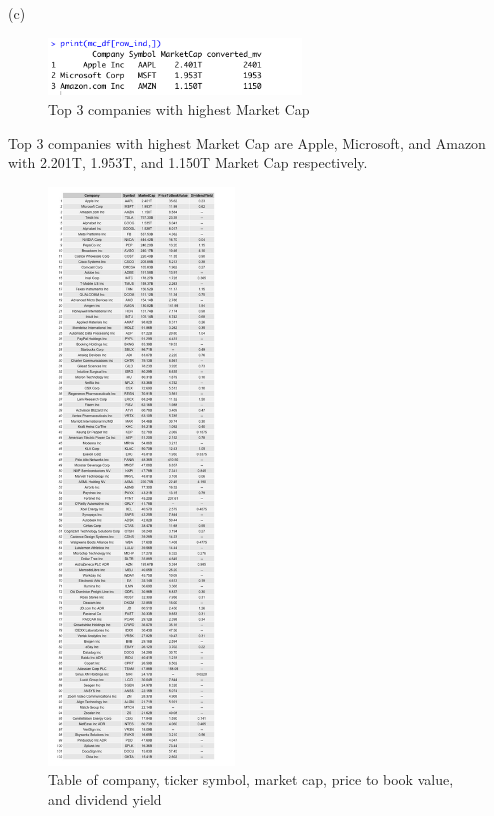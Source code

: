 \documentclass[11pt]{article}
\begin{document}
(c)
\begin{figure}[H]
    \centering
    \includegraphics[width=0.6\textwidth]{figures/Q3c.png}
    \caption{Top 3 companies with highest Market Cap}
\end{figure}
Top 3 companies with highest Market Cap are Apple, Microsoft, and Amazon with 2.201T, 1.953T, and 1.150T Market Cap respectively.
\begin{figure}[H]
    \centering
    \includegraphics[width=0.44\textwidth]{figures/Q3b_data.jpg}
    \caption{Table of company, ticker symbol, market cap, price to book value, and dividend yield}
\end{figure}
\end{document}
